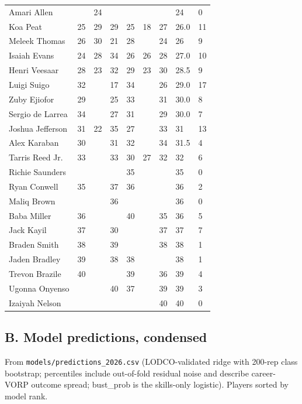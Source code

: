\documentclass[
  10pt,
]{article}
\begin{document}
{\begin{longtable}[]{@{}lllllllll@{}}
Amari Allen & & 24 & & & & & 24 & 0 \\
Koa Peat & 25 & 29 & 29 & 25 & 18 & 27 & 26.0 & 11 \\
Meleek Thomas & 26 & 30 & 21 & 28 & & 24 & 26 & 9 \\
Isaiah Evans & 24 & 28 & 34 & 26 & 26 & 28 & 27.0 & 10 \\
Henri Veesaar & 28 & 23 & 32 & 29 & 23 & 30 & 28.5 & 9 \\
Luigi Suigo & 32 & & 17 & 34 & & 26 & 29.0 & 17 \\
Zuby Ejiofor & 29 & & 25 & 33 & & 31 & 30.0 & 8 \\
Sergio de Larrea & 34 & & 27 & 31 & & 29 & 30.0 & 7 \\
Joshua Jefferson & 31 & 22 & 35 & 27 & & 33 & 31 & 13 \\
Alex Karaban & 30 & & 31 & 32 & & 34 & 31.5 & 4 \\
Tarris Reed Jr. & 33 & & 33 & 30 & 27 & 32 & 32 & 6 \\
Richie Saunders & & & & 35 & & & 35 & 0 \\
Ryan Conwell & 35 & & 37 & 36 & & & 36 & 2 \\
Maliq Brown & & & 36 & & & & 36 & 0 \\
Baba Miller & 36 & & & 40 & & 35 & 36 & 5 \\
Jack Kayil & 37 & & 30 & & & 37 & 37 & 7 \\
Braden Smith & 38 & & 39 & & & 38 & 38 & 1 \\
Jaden Bradley & 39 & & 38 & 38 & & & 38 & 1 \\
Trevon Brazile & 40 & & & 39 & & 36 & 39 & 4 \\
Ugonna Onyenso & & & 40 & 37 & & 39 & 39 & 3 \\
Izaiyah Nelson & & & & & & 40 & 40 & 0 \\
\end{longtable}
}

\subsection{B. Model predictions,
condensed}\label{b.-model-predictions-condensed}

From \texttt{models/predictions\_2026.csv} (LODCO-validated ridge with 200-rep
class bootstrap; percentiles include out-of-fold residual noise and describe
career-VORP outcome spread; bust\_prob is the skills-only logistic). Players
sorted by model rank.
\end{document}
